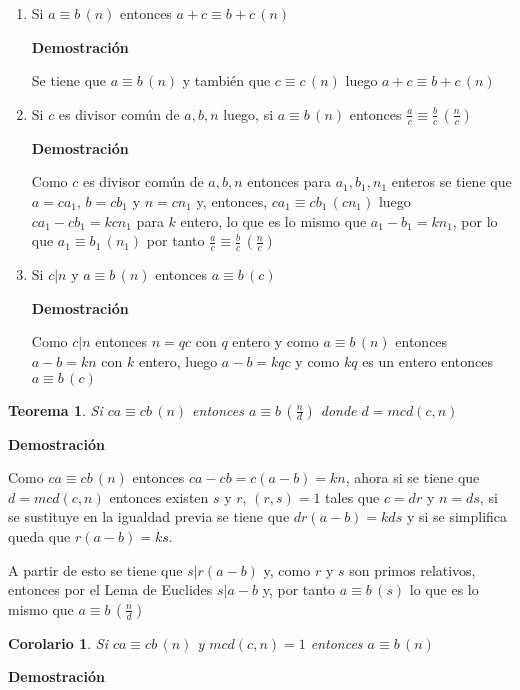 \documentclass[a4paper,12pt]{report}
\newtheorem*{teo}{Teorema}
\newtheorem*{cor}{Corolario}
\begin{document}
\begin{enumerate}
 \item Si $a \equiv b \, (n)$ entonces $a+c \equiv b+c \, (n)$
 
 \textbf{Demostración}
 
Se tiene que $a \equiv b \, (n)$ y también que $c \equiv c \, (n)$ luego $a+c \equiv b+c \, (n)$

 
 \item Si $c$ es divisor común de $a,b,n$ luego, si $a \equiv b \, (n)$ entonces $\frac{a}{c} \equiv \frac{b}{c} \, (\frac{n}{c})$
 
\textbf{Demostración}
 
 Como $c$ es divisor común de $a,b,n$ entonces para $a_1,b_1,n_1$ enteros se tiene que $a=ca_1$, $b=cb_1$ y $n=cn_1$ y, entonces, $ca_1 \equiv cb_1 \, (cn_1)$ luego $ca_1-cb_1=kcn_1$ para $k$ entero, lo que es lo mismo que $a_1-b_1=kn_1$, por lo que $a_1 \equiv b_1 \, (n_1)$ por tanto $\frac{a}{c} \equiv \frac{b}{c} \, (\frac{n}{c})$
 
 \item Si $c|n$ y $a \equiv b \, (n)$ entonces $a \equiv b \, (c)$

 \textbf{Demostración}
 
 Como $c|n$ entonces $n=qc$ con $q$ entero y como $a \equiv b \, (n)$ entonces $a-b=kn$ con $k$ entero, luego $a-b=kqc$ y como $kq$ es un entero entonces $a \equiv b \, (c)$
 
 
\end{enumerate}


\begin{teo}
 Si $ca \equiv cb \, (n)$ entonces $a \equiv b \, (\frac{n}{d})$ donde $d=mcd(c,n)$ 
\end{teo}

\textbf{Demostración}

Como $ca \equiv cb \, (n)$ entonces $ca-cb=c(a-b)=kn$, ahora si se tiene que $d=mcd(c,n)$  
entonces existen $s$ y $r$, $(r,s)=1$ tales que $c=dr$ y $n=ds$, si se sustituye en la igualdad previa se tiene que $dr(a-b)=kds$ y si se simplifica queda que $r(a-b)=ks$. 

A partir de esto se tiene que $s|r(a-b)$ y, como $r$ y $s$ son primos relativos, entonces por el Lema de Euclides $s|a-b$ y, por tanto $a\equiv b \, (s)$ lo que es lo mismo que $a\equiv b \, (\frac{n}{d})$


\begin{cor}
 Si $ca \equiv cb \, (n)$ y $mcd(c,n)=1$ entonces $a \equiv b \, (n)$
\end{cor}

\textbf{Demostración}
\end{document}
